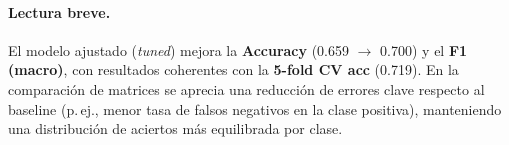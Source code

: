 \paragraph{Lectura breve.}
El modelo ajustado (\emph{tuned}) mejora la \textbf{Accuracy} (0.659 $\rightarrow$ 0.700) y el \textbf{F1 (macro)}, con resultados
coherentes con la \textbf{5-fold CV acc} (0.719). En la comparación de matrices se aprecia una reducción de errores
clave respecto al baseline (p.\,ej., menor tasa de falsos negativos en la clase positiva), manteniendo una
distribución de aciertos más equilibrada por clase.
